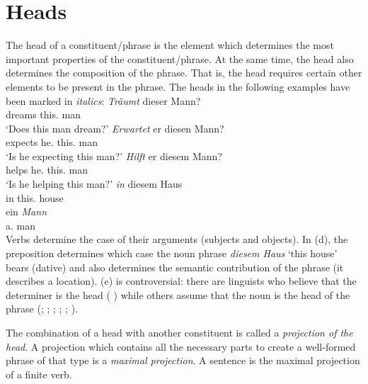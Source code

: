 {\section{Heads}
\label{Abschnitt-Kopf}

The head of a constituent/phrase is the element which determines the most important
properties of the constituent/phrase. At the same time, the head also determines the composition of the
phrase. That is, the head requires certain other elements to be present in the phrase. The heads in the following
examples have been marked in \emph{italics}:
\eal
\ex 
\gll \emph{Träumt} dieser Mann?\\
     dreams this.\nom{} man\\
\glt `Does this man dream?'
\ex 
\gll \emph{Erwartet} er diesen Mann?\\
	 expects he.\nom{} this.\acc{} man\\
\glt `Is he expecting this man?'
\ex 
\gll \emph{Hilft} er diesem Mann?\\
	 helps he.\nom{} this.\dat{} man\\
\glt `Is he helping this man?'
\ex 
\gll \emph{in} diesem Haus\\
	 in this.\dat{} house\\
\ex 
\gll ein \emph{Mann}\\
	 a.\nom{} man\\
\zl
Verbs determine the case of their arguments (subjects and objects). In (d), the preposition determines which case the noun phrase \emph{diesem Haus} `this house'
bears (dative) and also determines the semantic contribution of the phrase (it describes a location). (e) is controversial: there are linguists who believe that the
determiner is the head (\citealp{VH77a-u,Hellan86a,Abney87a,Netter94,Netter98a}%
) while others assume that the noun is the head of the phrase (\citealp{vanLangendonck94a}; \citealp[]{ps2}; \citealp{Demske2001a};
\citealp[Section~6.6.1]{MuellerLehrbuch1}; \citealp{Hudson2004a}; \citealp{Bruening2009a}).


The combination of a head with another constituent is called a \emph{projection
of the head}. A projection which contains all the necessary parts to create a well-formed phrase of that type
is a \emph{maximal projection}. A sentence is the maximal projection of a finite verb.

}
